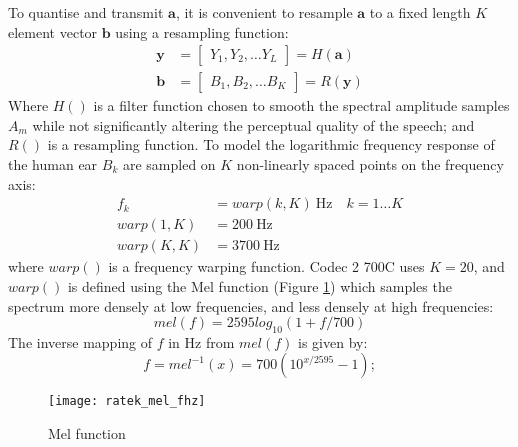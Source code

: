 \documentclass{article}
\begin{document}
To quantise and transmit $\mathbf{a}$, it is convenient to resample $\mathbf{a}$ to a fixed length $K$ element vector $\mathbf{b}$ using a resampling function:
\begin{equation}
\begin{split}
\mathbf{y} &= \begin{bmatrix} Y_1, Y_2, \ldots Y_L \end{bmatrix} = H(\mathbf{a}) \\
\mathbf{b} &= \begin{bmatrix} B_1, B_2, \ldots B_K \end{bmatrix} = R(\mathbf{y})
\end{split}
\end{equation}
Where $H()$ is a filter function chosen to smooth the spectral amplitude samples $A_m$ while not significantly altering the perceptual quality of the speech; and $R()$ is a resampling function. To model the logarithmic frequency response of the human ear $B_k$  are sampled on $K$ non-linearly spaced points on the frequency axis:
\begin{equation}
\begin{split}
f_k &= warp(k,K) \ \textrm{Hz} \quad k=1 \ldots K \\
warp(1,K) &= 200 \ \textrm{Hz} \\
warp(K,K) &= 3700 \ \textrm{Hz}
\end{split}
\end{equation}
where $warp()$ is a frequency warping function. Codec 2 700C uses $K=20$, and $warp()$ is defined using the Mel function (Figure \ref{fig:mel_fhz}) which samples the spectrum more densely at low frequencies, and less densely at high frequencies:
\begin{equation} \label{eq:mel_f}
mel(f) = 2595log_{10}(1+f/700)
\end{equation}
The inverse mapping of $f$ in Hz from $mel(f)$ is given by:
\begin{equation} \label{eq:f_mel}
f = mel^{-1}(x) = 700(10^{x/2595} - 1);
\end{equation}

\begin{figure}[h]
\caption{Mel function}
\label{fig:mel_fhz}
\texttt{[image: ratek\_mel\_fhz]}
\end{figure}
\end{document}
